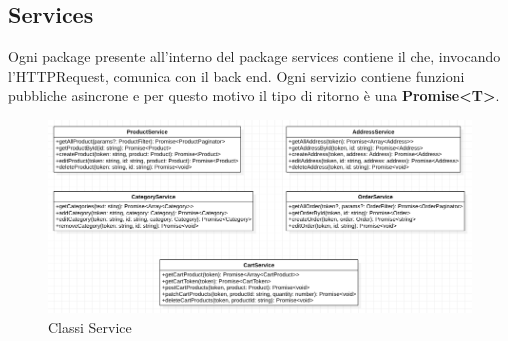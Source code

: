 \subsection{Services}\label{Services}
Ogni package presente all'interno del package services contiene il  che, invocando l'HTTPRequest, comunica con il back end. Ogni servizio contiene funzioni pubbliche asincrone e per questo motivo il tipo di ritorno è una \textbf{Promise<T>}.
\begin{figure}[H]
	\centering
	\includegraphics[scale=0.5]{Immagini/Frontend/ClassiService.png}
	\caption{Classi Service}
	\label{fig:feService}
\end{figure}
\newpage
